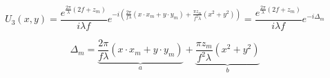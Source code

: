 \documentclass{kepfl}
\begin{document}
\begin{equation}
{U_3}(x,y) = \frac{{{e^{\frac{{2\pi }}{\lambda }\left( {2f + {z_m}} \right)}}}}{{i\lambda f}}{e^{ - i\left( {\frac{{2\pi }}{{f\lambda }}(x \cdot {x_m} + y \cdot {y_m}) + \frac{{\pi {z_m}}}{{{f^2}\lambda }}({x^2} + {y^2})} \right)}} = \frac{{{e^{\frac{{2\pi }}{\lambda }\left( {2f + {z_m}} \right)}}}}{{i\lambda f}}{e^{ - i{\Delta _m}}}
\end{equation}

\begin{equation}
{\Delta _m} = \underbrace {\frac{{2\pi }}{{f\lambda }}(x \cdot {x_m} + y \cdot {y_m})}_a + \underbrace {\frac{{\pi {z_m}}}{{{f^2}\lambda }}({x^2} + {y^2})}_b	
\end{equation}
\end{document}
